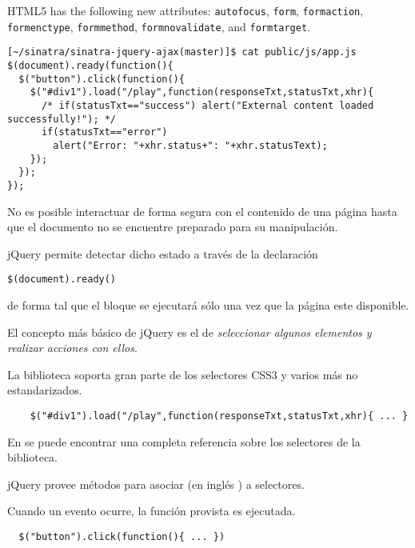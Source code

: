 HTML5 has the following new attributes: \verb|autofocus|, \verb|form|, \verb|formaction|, \verb|formenctype|, \verb|formmethod|, \verb|formnovalidate|, and \verb|formtarget|.



\begin{verbatim}
[~/sinatra/sinatra-jquery-ajax(master)]$ cat public/js/app.js 
$(document).ready(function(){
  $("button").click(function(){
    $("#div1").load("/play",function(responseTxt,statusTxt,xhr){
      /* if(statusTxt=="success") alert("External content loaded successfully!"); */
      if(statusTxt=="error")
        alert("Error: "+xhr.status+": "+xhr.statusText);
    });
  });
});
\end{verbatim}

No es posible interactuar de forma segura con el contenido de una página hasta que el documento no se encuentre preparado para su manipulación. 

jQuery permite detectar dicho estado a través de la declaración 
\begin{verbatim}
$(document).ready() 
\end{verbatim}
de forma tal que el bloque se ejecutará sólo una vez que la página este disponible.

El concepto más básico de jQuery es el de 
\emph{seleccionar algunos elementos y realizar acciones con ellos}.

La biblioteca soporta gran parte de los selectores CSS3 y varios más no estandarizados. 

\begin{verbatim}
    $("#div1").load("/play",function(responseTxt,statusTxt,xhr){ ... }
\end{verbatim}

En 
se puede encontrar una completa referencia sobre los selectores de la biblioteca.


jQuery provee métodos para asociar  (en inglés ) 
a selectores. 

Cuando un evento ocurre, la función provista es ejecutada. 
\begin{verbatim}
  $("button").click(function(){ ... })
\end{verbatim}

